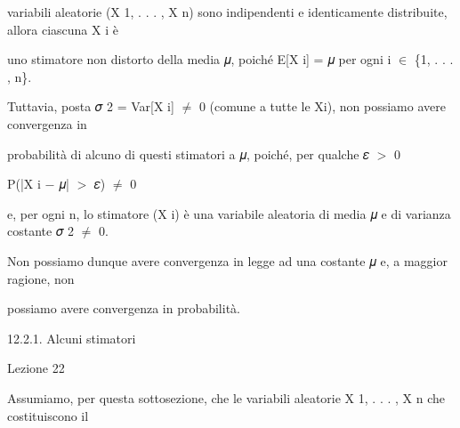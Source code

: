 \documentclass[a4paper,portrait,12pt]{article}
\begin{document}
\begin{flushleft}
variabili aleatorie (X 1, . . . , X n) sono indipendenti e identicamente distribuite, allora ciascuna X i \`{e}
\end{flushleft}


\begin{flushleft}
uno stimatore non distorto della media 𝜇, poich\'{e} E[X i] = 𝜇 per ogni i $\in$ \{1, . . . , n\}.
\end{flushleft}


\begin{flushleft}
Tuttavia, posta 𝜎 2 = Var[X i] $\neq$ 0 (comune a tutte le Xi), non possiamo avere convergenza in
\end{flushleft}


\begin{flushleft}
probabilit\`{a} di alcuno di questi stimatori a 𝜇, poich\'{e}, per qualche 𝜀 $>$ 0
\end{flushleft}


\begin{flushleft}
P(|X i $-$ 𝜇| $>$ 𝜀) $\neq$ 0
\end{flushleft}


\begin{flushleft}
e, per ogni n, lo stimatore (X i) \`{e} una variabile aleatoria di media 𝜇 e di varianza costante 𝜎 2 $\neq$ 0.
\end{flushleft}


\begin{flushleft}
Non possiamo dunque avere convergenza in legge ad una costante 𝜇 e, a maggior ragione, non
\end{flushleft}


\begin{flushleft}
possiamo avere convergenza in probabilit\`{a}.
\end{flushleft}





\begin{flushleft}
12.2.1. Alcuni stimatori
\end{flushleft}





\begin{flushleft}
Lezione 22
\end{flushleft}





\begin{flushleft}
Assumiamo, per questa sottosezione, che le variabili aleatorie X 1, . . . , X n che costituiscono il
\end{flushleft}
\end{document}
